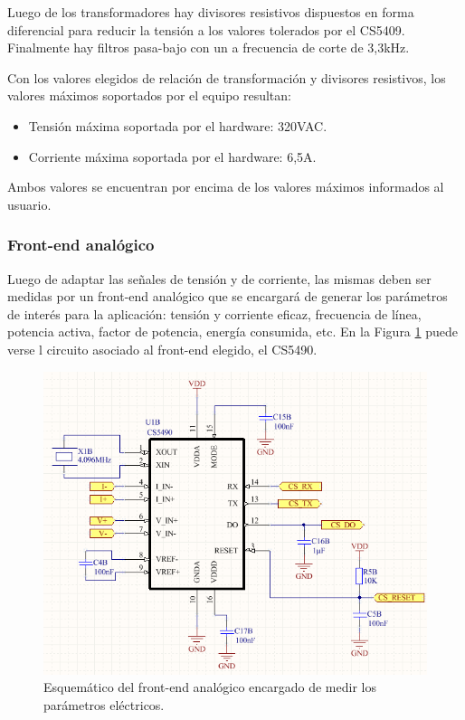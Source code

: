 Luego de los transformadores hay divisores resistivos dispuestos en forma diferencial para reducir la tensión a los valores tolerados por el CS5409. Finalmente hay filtros pasa-bajo con un a frecuencia de corte de 3,3kHz.

Con los valores elegidos de relación de transformación y divisores resistivos, los valores máximos soportados por el equipo resultan:

\begin{itemize}
\item Tensión máxima soportada por el hardware: 320VAC.
\item Corriente máxima soportada por el hardware: 6,5A.
\end{itemize}

Ambos valores se encuentran por encima de los valores máximos informados al usuario.


\subsubsection{Front-end analógico}

Luego de adaptar las señales de tensión y de corriente, las mismas deben ser medidas por un front-end analógico que se encargará de generar los parámetros de interés para la aplicación: tensión y corriente eficaz, frecuencia de línea, potencia activa, factor de potencia, energía consumida, etc. En la Figura \ref{fig:pcb_medicion_energia} puede verse l circuito asociado al front-end elegido, el CS5490.

\begin{figure}[h]
	\centering
	\includegraphics[width=14cm]{./Figures/3_1_2_pcb_medicion_energia.png}
	\caption{Esquemático del front-end analógico encargado de medir los parámetros eléctricos.}
	\label{fig:pcb_medicion_energia}
\end{figure}

